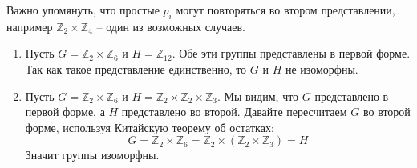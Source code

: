 Важно упомянуть, что простые $p_i$ могут повторяться во втором представлении, например $\mathbb Z_2\times \mathbb Z_4$ -- один из возможных случаев.

\begin{examples}
\begin{enumerate}
\item Пусть $G = \mathbb Z_2 \times \mathbb Z_6$ и $H = \mathbb Z_{12}$.
Обе эти группы представлены в первой форме.
Так как такое представление единственно, то $G$ и $H$ не изоморфны.

\item Пусть $G = \mathbb Z_2 \times \mathbb Z_6$ и $H = \mathbb Z_2\times \mathbb Z_2\times \mathbb Z_3$.
Мы видим, что $G$ представлено в первой форме, а $H$ представлено во второй.
Давайте пересчитаем $G$ во второй форме, используя Китайскую теорему об остатках:
\[
G = \mathbb Z_2 \times \mathbb Z_6 = \mathbb Z_2 \times (\mathbb Z_2 \times \mathbb Z_3) = H
\]
Значит группы изоморфны.
\end{enumerate}
\end{examples}


